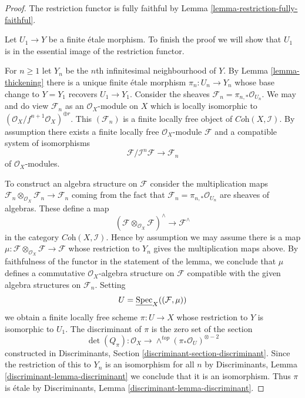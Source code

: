 \begin{proof}
The restriction functor is fully faithful by
Lemma \ref{lemma-restriction-fully-faithful}.

\medskip\noindent
Let $U_1 \to Y$ be a finite \'etale morphism. To finish the proof
we will show that $U_1$ is in the essential image of the
restriction functor.

\medskip\noindent
For $n \geq 1$ let $Y_n$ be the $n$th infinitesimal neighbourhood of $Y$.
By Lemma \ref{lemma-thickening}
there is a unique finite \'etale morphism
$\pi_n : U_n \to Y_n$ whose base change to $Y = Y_1$
recovers $U_1 \to Y_1$.
Consider the sheaves $\mathcal{F}_n = \pi_{n, *}\mathcal{O}_{U_n}$.
We may and do view $\mathcal{F}_n$ as an $\mathcal{O}_X$-module on $X$
which is locally isomorphic to
$(\mathcal{O}_X/f^{n + 1}\mathcal{O}_X)^{\oplus r}$.
This $(\mathcal{F}_n)$ is a finite locally free object of
$\textit{Coh}(X, \mathcal{I})$.
By assumption there exists a finite locally free $\mathcal{O}_X$-module
$\mathcal{F}$ and a compatible system of isomorphisms
$$
\mathcal{F}/\mathcal{I}^n\mathcal{F} \to \mathcal{F}_n
$$
of $\mathcal{O}_X$-modules.

\medskip\noindent
To construct an algebra structure on $\mathcal{F}$ consider the multiplication
maps
$\mathcal{F}_n \otimes_{\mathcal{O}_X} \mathcal{F}_n \to \mathcal{F}_n$
coming from the fact that $\mathcal{F}_n = \pi_{n, *}\mathcal{O}_{U_n}$
are sheaves of algebras. These define a map
$$
(\mathcal{F}\otimes_{\mathcal{O}_X} \mathcal{F})^\wedge
\longrightarrow
\mathcal{F}^\wedge
$$
in the category $\textit{Coh}(X, \mathcal{I})$. Hence by assumption
we may assume there is a map
$\mu : \mathcal{F}\otimes_{\mathcal{O}_X} \mathcal{F} \to \mathcal{F}$
whose restriction to $Y_n$ gives the multiplication maps above.
By faithfulness of the functor in the statement of the lemma,
we conclude that $\mu$ defines a commutative $\mathcal{O}_X$-algebra
structure on $\mathcal{F}$ compatible with the given algebra
structures on $\mathcal{F}_n$.
Setting
$$
U = \underline{\mathop{\mathrm{Spec}}}_X((\mathcal{F}, \mu))
$$
we obtain a finite locally free scheme $\pi : U \to X$ whose restriction
to $Y$ is isomorphic to $U_1$. The discriminant of $\pi$ is the zero
set of the section
$$
\det(Q_\pi) :
\mathcal{O}_X
\longrightarrow
\wedge^{top}(\pi_*\mathcal{O}_U)^{\otimes -2}
$$
constructed in
Discriminants, Section \ref{discriminant-section-discriminant}.
Since the restriction of this to $Y_n$ is an isomorphism for all $n$
by Discriminants, Lemma \ref{discriminant-lemma-discriminant}
we conclude that it is an isomorphism. Thus $\pi$ is \'etale by
Discriminants, Lemma \ref{discriminant-lemma-discriminant}.
\end{proof}

